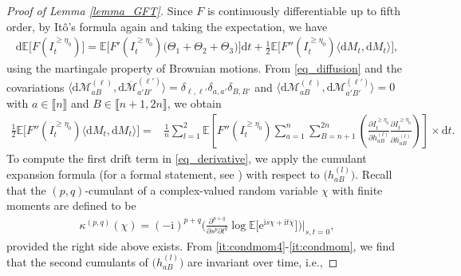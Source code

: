 \documentclass[10pt,reqno]{amsart}
\newcommand{\II}{I^{\geq \eta_0}} %
\newcommand{\dd}{\mathrm{d}}
\newcommand{\ii}{\mathrm{i}}
\newcommand{\ie}{i.e., }
\newcommand{\<}{\langle}
\renewcommand{\>}{\rangle}
\numberwithin{equation}{section}
\begin{document}
\begin{proof}[Proof of Lemma \ref{lemma_GFT}]
Since $F$ is continuously differentiable up to fifth order, by Itô's formula again and taking the expectation, we have
\begin{align}\label{eq_derivative}
\dd \mathbb{E}\big[ F(\II_t)\big]=\mathbb{E} \Big[ F'(\II_t) \big( \Theta_1+\Theta_2+\Theta_3 \big) \Big] \dd t + \frac{1}{2} \mathbb{E}\Big[ F''(\II_t) \big\< \dd M_t, \dd M_t  \big\>\Big],
\end{align}
using the martingale property of Brownian motions. 
From
\eqref{eq_diffusion} and the 
covariations 
$\langle \mathrm d \mathcal M_{aB}^{(\ell)}, 
\mathrm d \overline{\mathcal M}_{a'B'}^{(\ell')} \rangle
= \delta_{\ell,\ell'} \delta_{a,a'} \delta_{B,B'}$ 
and
$\langle \mathrm d \mathcal M_{aB}^{(\ell)}, 
\mathrm d \mathcal M_{a'B'}^{(\ell')} \rangle
= 0$ with $a \in 
\llbracket n \rrbracket$ and 
$B\in \llbracket n+1,2n \rrbracket$, we obtain
\begin{align}\label{eq_variation}
\frac{1}{2} \mathbb{E}\Big[ F''(\II_t) \big\< \dd M_t, \dd M_t  \big\>\Big]=&
\frac{1}{n} \sum_{l=1}^2 \mathbb{E} \left[F''(\II_t)
 \sum_{a=1}^n \sum_{B=n+1}^{2n}  \left(   \frac{ \partial \II_t}{\partial h^{(l)}_{aB}}      \frac{\partial \II_t}{\partial \overline{h^{(l)}_{aB}}} \right)\right] \times \dd t.
\end{align}
To compute the first drift term in \eqref{eq_derivative}, we apply the cumulant expansion formula (for a formal statement, see \cite[Lemma 7.1]{zbMATH06775355}) with respect to $\big(h^{(l)}_{aB}\big)$. Recall that the $(p,q)$-cumulant of a complex-valued random variable $\chi$ with finite moments are defined to be 
\begin{align}\label{cumulant_pq}
	\kappa^{(p,q)}(\chi)=(-\ii)^{p+q} \Big( \frac{\partial^{p+q}}{\partial s^p \partial t^q} \log \mathbb{E} \big[\mathrm{e}^{\ii s \chi+\ii t \overline{\chi}} \big] \Big) \Big|_{s,t=0},
\end{align}
provided the right side above exists. From \ref{it:condmom4}-\ref{it:condmom}, we find that the second cumulants of $\big(h^{(l)}_{aB}\big)$ are invariant over time, \ie

\end{proof}
\end{document}
